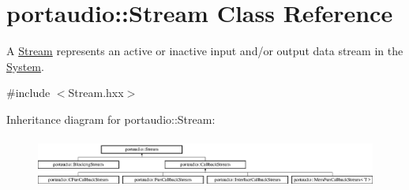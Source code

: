 \hypertarget{classportaudio_1_1_stream}{}\section{portaudio\+:\+:Stream Class Reference}
\label{classportaudio_1_1_stream}


A \hyperlink{classportaudio_1_1_stream}{Stream} represents an active or inactive input and/or output data stream in the \hyperlink{classportaudio_1_1_system}{System}.  




{\ttfamily \#include $<$Stream.\+hxx$>$}

Inheritance diagram for portaudio\+:\+:Stream\+:\begin{figure}[H]
\begin{center}
\leavevmode
\includegraphics[height=1.700405cm]{classportaudio_1_1_stream}
\end{center}
\end{figure}
